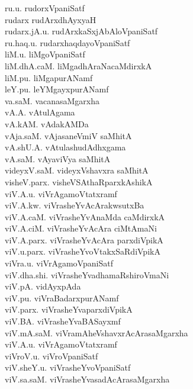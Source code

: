 {\begin{multicols}{2}
\begin{tabbing}
ru.u. \> rudorxVpaniSatf\\[2pt]
rudarx \> rudArxdhAyxyaH\\[2pt]
rudarx.jA.u. \> rudArxkaSxjAbAloVpaniSatf\\[2pt]
ru.haq.u. \> rudarxhaqdayoVpaniSatf\\[2pt]
liM.u. \> liMgoVpaniSatf\\[2pt]
liM.dhA.caM. \> liMgadhAraNacaMdirxkA\\[2pt]
liM.pu. \> liMgapurANamf\\[2pt]
leY.pu. \> leYMgayxpurANamf\\[2pt]
va.saM. \> vacanasaMgarxha\\[2pt]
vA.A. \> vAtulAgama\\[2pt]
vA.kAM. \> vAdakAMDa\\[2pt]
vAja.saM. \> vAjasaneVmiV saMhitA\\[2pt]
vA.shU.A. \> vAtulashudAdhxgama\\[2pt]
vA.saM. \> vAyaviVya saMhitA\\[2pt]
videyxV.saM. \> videyxVshavxra saMhitA\\[2pt]
visheV.parx. \> visheVSAthaRparxkAshikA\\[2pt]
viV.A.u. \> viVrAgamoVtatxramf\\[2pt]
viV.A.kw. \> viVrasheYvAcArakwsutxBa\\[2pt]
viV.A.caM. \> viVrasheYvAnaMda caMdirxkA\\[2pt]
viV.A.ciM. \> viVrasheYvAcAra ciMtAmaNi\\[2pt]
viV.A.parx. \> viVrasheYvAcAra parxdiVpikA\\[2pt]
viV.u.parx. \> viVrasheYvoVtakxSaRdiVpikA\\[2pt]
viVra.u. \> viVrAgamoVpaniSatf\\[2pt]
viV.dha.shi. \> viVrasheYvadhamaRshiroVmaNi\\[2pt]
viV.pA. \> vidAyxpAda\\[2pt]
viV.pu. \> viVraBadarxpurANamf\\[2pt]
viV.parx. \> viVrasheYvaparxdiVpikA\\[2pt]
viV.BA. \> viVrasheYvaBASayxmf\\[2pt]
viV.mA.saM. \> viVramAheVshavxrAcArasaMgarxha\\[2pt]
viV.A.u. \> viVrAgamoVtatxramf\\[2pt]
viVroV.u. \> viVroVpaniSatf\\[2pt]
viV.sheY.u. \> viVrasheYvoVpaniSatf\\[2pt]
viV.sa.saM. \> viVrasheYvasadAcArasaMgarxha\\[2pt]

\end{tabbing}
\end{multicols}}
